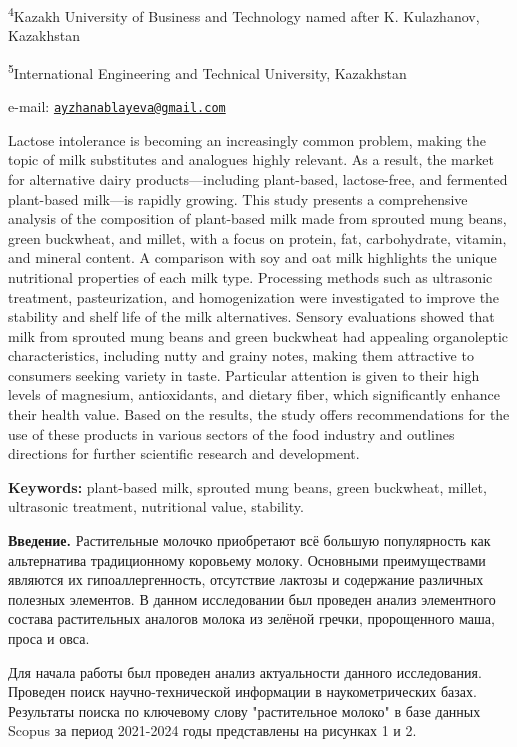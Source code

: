 \textsuperscript{4}Kazakh University of Business and Technology named
after K. Kulazhanov, Kazakhstan

\textsuperscript{5}International Engineering and Technical University,
Kazakhstan

e-mail:
\href{mailto:ayzhanablayeva@gmail.com}{\nolinkurl{ayzhanablayeva@gmail.com}}

Lactose intolerance is becoming an increasingly common problem, making
the topic of milk substitutes and analogues highly relevant. As a
result, the market for alternative dairy products---including
plant-based, lactose-free, and fermented plant-based milk---is rapidly
growing. This study presents a comprehensive analysis of the composition
of plant-based milk made from sprouted mung beans, green buckwheat, and
millet, with a focus on protein, fat, carbohydrate, vitamin, and mineral
content. A comparison with soy and oat milk highlights the unique
nutritional properties of each milk type. Processing methods such as
ultrasonic treatment, pasteurization, and homogenization were
investigated to improve the stability and shelf life of the milk
alternatives. Sensory evaluations showed that milk from sprouted mung
beans and green buckwheat had appealing organoleptic characteristics,
including nutty and grainy notes, making them attractive to consumers
seeking variety in taste. Particular attention is given to their high
levels of magnesium, antioxidants, and dietary fiber, which
significantly enhance their health value. Based on the results, the
study offers recommendations for the use of these products in various
sectors of the food industry and outlines directions for further
scientific research and development.

{\bfseries Keywords:} plant-based milk, sprouted mung beans, green
buckwheat, millet, ultrasonic treatment, nutritional value, stability.

{\bfseries Введение.} Растительные молочко приобретают всё большую
популярность как альтернатива традиционному коровьему молоку. Основными
преимуществами являются их гипоаллергенность, отсутствие лактозы и
содержание различных полезных элементов. В данном исследовании был
проведен анализ элементного состава растительных аналогов молока из
зелёной гречки, пророщенного маша, проса и овса.

Для начала работы был проведен анализ актуальности данного исследования.
Проведен поиск научно-технической информации в наукометрических базах.
Результаты поиска по ключевому слову "растительное молоко" в базе данных
Scopus за период 2021-2024 годы представлены на рисунках 1 и 2.


